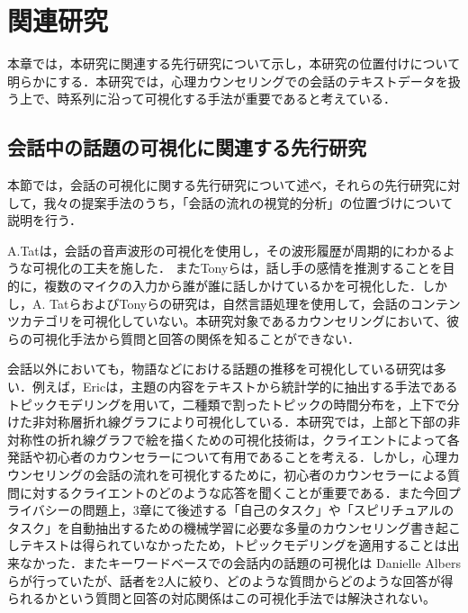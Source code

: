 \documentclass[shuuron]{kuee}
\begin{document}







\chapter{関連研究}






本章では，本研究に関連する先行研究について示し，本研究の位置付けについて明らかにする．本研究では，心理カウンセリングでの会話のテキストデータを扱う上で、時系列に沿って可視化する手法が重要であると考えている．

\section{会話中の話題の可視化に関連する先行研究}

本節では，会話の可視化に関する先行研究について述べ，それらの先行研究に対して，我々の提案手法のうち，「会話の流れの視覚的分析」の位置づけについて説明を行う．

A.Tat\cite{tat2002visualising}は，会話の音声波形の可視化を使用し，その波形履歴が周期的にわかるような可視化の工夫を施した．
またTonyら\cite{bergstrom2007seeing}は，話し手の感情を推測することを目的に，複数のマイクの入力から誰が誰に話しかけているかを可視化した．しかし，A. TatらおよびTonyらの研究は，自然言語処理を使用して，会話のコンテンツカテゴリを可視化していない。本研究対象であるカウンセリングにおいて、彼らの可視化手法から質問と回答の関係を知ることができない．

会話以外においても，物語などにおける話題の推移を可視化している研究は多い．例えば，Eric\cite{taskdriven}は，主題の内容をテキストから統計学的に抽出する手法であるトピックモデリングを用いて，二種類で割ったトピックの時間分布を，上下で分けた非対称層折れ線グラフにより可視化している．本研究では，上部と下部の非対称性の折れ線グラフで絵を描くための可視化技術は，クライエントによって各発話や初心者のカウンセラーについて有用であることを考える．しかし，心理カウンセリングの会話の流れを可視化するために，初心者のカウンセラーによる質問に対するクライエントのどのような応答を聞くことが重要である．また今回プライバシーの問題上，3章にて後述する「自己のタスク」や「スピリチュアルのタスク」を自動抽出するための機械学習に必要な多量のカウンセリング書き起こしテキストは得られていなかったため，トピックモデリングを適用することは出来なかった．またキーワードベースでの会話内の話題の可視化は Danielle Albersら\cite{angus2012conceptual}が行っていたが、話者を2人に絞り、どのような質問からどのような回答が得られるかという質問と回答の対応関係はこの可視化手法では解決されない。
\end{document}
